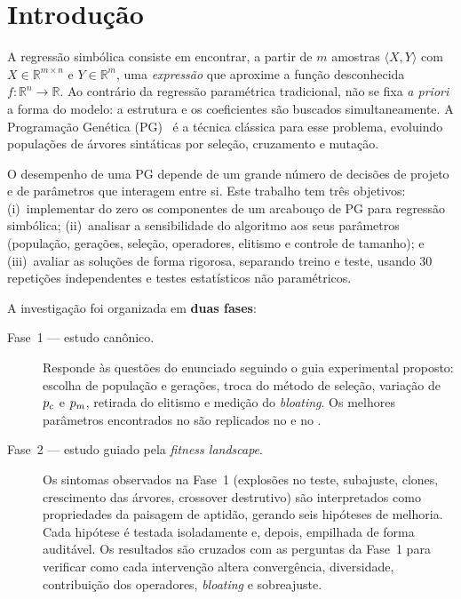 \section{Introdução}
\label{sec:introducao}

A regressão simbólica consiste em encontrar, a partir de $m$ amostras
$\langle X, Y\rangle$ com $X\in\mathbb{R}^{m\times n}$ e $Y\in\mathbb{R}^{m}$,
uma \emph{expressão} que aproxime a função desconhecida
$f:\mathbb{R}^n\to\mathbb{R}$. Ao contrário da regressão paramétrica
tradicional, não se fixa \emph{a priori} a forma do modelo: a estrutura e os
coeficientes são buscados simultaneamente. A Programação Genética
(PG)~\cite{koza1992genetic,poli2008field} é a técnica clássica para esse
problema, evoluindo populações de árvores sintáticas por seleção, cruzamento e
mutação.

O desempenho de uma PG depende de um grande número de decisões de projeto e
de parâmetros que interagem entre si. Este trabalho tem três objetivos:
(i)~implementar do zero os componentes de um arcabouço de PG para regressão
simbólica; (ii)~analisar a sensibilidade do algoritmo aos seus parâmetros
(população, gerações, seleção, operadores, elitismo e controle de tamanho);
e (iii)~avaliar as soluções de forma rigorosa, separando treino e teste,
usando 30 repetições independentes e testes estatísticos não paramétricos.

A investigação foi organizada em \textbf{duas fases}:

\begin{description}
  \item[Fase~1 --- estudo canônico.] Responde às questões do enunciado
        seguindo o guia experimental proposto: escolha de população e
        gerações, troca do método de seleção, variação de $p_c$ e $p_m$,
        retirada do elitismo e medição do \emph{bloating}. Os melhores
        parâmetros encontrados no  são replicados no
         e no .
  \item[Fase~2 --- estudo guiado pela \emph{fitness landscape}.] Os sintomas
        observados na Fase~1 (explosões no teste, subajuste, clones,
        crescimento das árvores, crossover destrutivo) são interpretados
        como propriedades da paisagem de aptidão, gerando seis hipóteses de
        melhoria. Cada hipótese é testada isoladamente e, depois, empilhada
        de forma auditável. Os resultados são cruzados com as perguntas da
        Fase~1 para verificar como cada intervenção altera convergência,
        diversidade, contribuição dos operadores, \emph{bloating} e
        sobreajuste.
\end{description}

